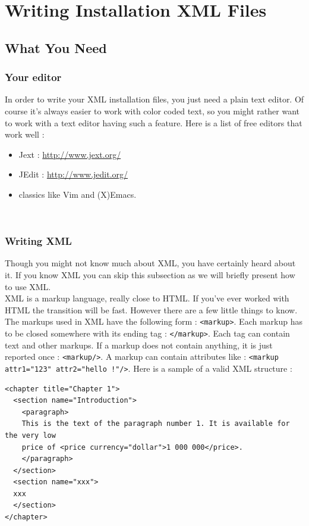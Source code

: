 \chapter{Writing Installation XML Files}

\section{What You Need}

\subsection{Your editor}

In order to write your XML installation files, you just need a plain
text editor. Of course it's always easier to work with color coded text,
so you might rather want to work with a text editor having such a
feature. Here is a list of free editors that work well :
\begin{itemize}
  \item Jext : \url{http://www.jext.org/}
  \item JEdit : \url{http://www.jedit.org/}
  \item classics like Vim and (X)Emacs.
\end{itemize}\

\subsection{Writing XML}

Though you might not know much about XML, you have certainly heard about
it. If you know XML you can skip this subsection as we will briefly
present how to use XML.\\

XML is a markup language, really close to HTML. If you've ever worked
with HTML the transition will be fast. However there are a few little
things to know. The markups used in XML have the following form :
\texttt{<markup>}. Each markup has to be closed somewhere with its
ending tag : \texttt{</markup>}. Each tag can contain text and other
markups. If a markup does not contain anything, it is just reported once
: \texttt{<markup/>}. A markup can contain attributes like :
\texttt{<markup attr1="123" attr2="hello !"/>}. Here is a sample of a
valid XML structure :
\footnotesize
\begin{verbatim}
<chapter title="Chapter 1">
  <section name="Introduction">
    <paragraph>
    This is the text of the paragraph number 1. It is available for the very low
    price of <price currency="dollar">1 000 000</price>.
    </paragraph>
  </section>
  <section name="xxx">
  xxx
  </section>
</chapter>
\end{verbatim}
\normalsize

